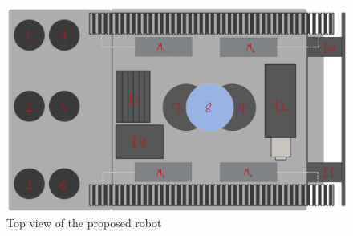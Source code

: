 \newpage

\begin{figure}[!ht]
  \centering
  \includegraphics[width=13cm]{tex/00 - Images/top_view_sp2.png}
  \caption{Top view of the proposed robot}
  \label{fig:top_view_sp,}
\end{figure}

